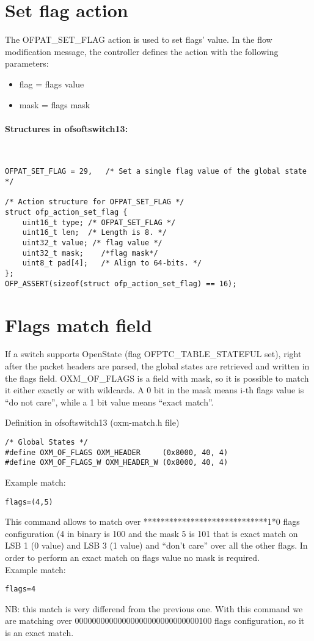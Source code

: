 \section{Set flag action}
\label{section:set_flag_action}
The OFPAT\_SET\_FLAG action is used to set flags' value.
In the flow modification message, the controller defines the action with the following parameters:
\begin{itemize}
\setlength\itemsep{0em}
\item flag = flags value
\item mask = flags mask
\end{itemize}

\paragraph{Structures in ofsoftswitch13:}\mbox{}\\
\begin{verbatim}
OFPAT_SET_FLAG = 29,   /* Set a single flag value of the global state */

/* Action structure for OFPAT_SET_FLAG */
struct ofp_action_set_flag {
    uint16_t type; /* OFPAT_SET_FLAG */
    uint16_t len;  /* Length is 8. */
    uint32_t value; /* flag value */
    uint32_t mask;    /*flag mask*/
    uint8_t pad[4];   /* Align to 64-bits. */
};
OFP_ASSERT(sizeof(struct ofp_action_set_flag) == 16);
\end{verbatim}

\section{Flags match field}
\label{section:oxm_of_flags}

If a switch supports OpenState (flag OFPTC\_TABLE\_STATEFUL set), right after the packet headers are parsed, the global states are retrieved and written in the flags field. OXM\_OF\_FLAGS is a field with mask, so it is possible to match it either exactly or with wildcards. A 0 bit in the mask means i-th flags value is ``do not care'', while a 1 bit value means ``exact match''.

Definition in ofsoftswitch13 (oxm-match.h file)
\begin{verbatim}
/* Global States */
#define OXM_OF_FLAGS OXM_HEADER     (0x8000, 40, 4)
#define OXM_OF_FLAGS_W OXM_HEADER_W (0x8000, 40, 4)
\end{verbatim}
Example match:
\begin{verbatim}
flags=(4,5)
\end{verbatim}
This command allows to match over *****************************1*0 flags configuration (4 in binary is 100 and the mask 5 is 101 that is exact match on LSB 1 (0 value) and LSB 3 (1 value) and ``don’t care'' over all the other flags. In order to perform an exact match on flags value no mask is required.
\\Example match:
\begin{verbatim}
flags=4
\end{verbatim}
NB: this match is very differend from the previous one. With this command we are matching over 00000000000000000000000000000100 flags configuration, so it is an exact match.


